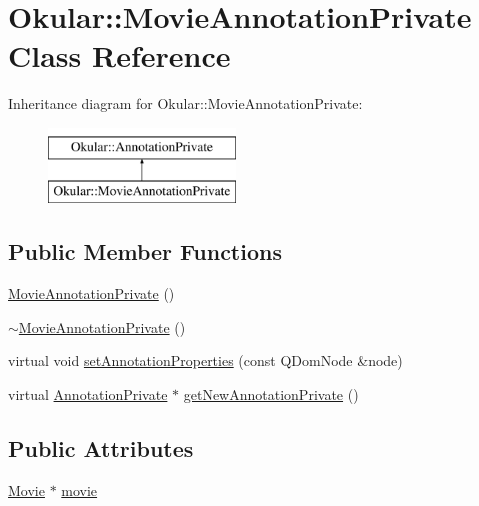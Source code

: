 \hypertarget{classOkular_1_1MovieAnnotationPrivate}{\section{Okular\+:\+:Movie\+Annotation\+Private Class Reference}
\label{classOkular_1_1MovieAnnotationPrivate}
}
Inheritance diagram for Okular\+:\+:Movie\+Annotation\+Private\+:\begin{figure}[H]
\begin{center}
\leavevmode
\includegraphics[height=2.000000cm]{classOkular_1_1MovieAnnotationPrivate}
\end{center}
\end{figure}
\subsection*{Public Member Functions}
\begin{DoxyCompactItemize}
\item 
\hyperlink{classOkular_1_1MovieAnnotationPrivate_ac38968faac343d6e0e3cc54916b3ce3d}{Movie\+Annotation\+Private} ()
\item 
\hyperlink{classOkular_1_1MovieAnnotationPrivate_a75df257ea01681afc93333612029275c}{$\sim$\+Movie\+Annotation\+Private} ()
\item 
virtual void \hyperlink{classOkular_1_1MovieAnnotationPrivate_aa5cb435a725e96aa3feef2049eb6ad10}{set\+Annotation\+Properties} (const Q\+Dom\+Node \&node)
\item 
virtual \hyperlink{classOkular_1_1AnnotationPrivate}{Annotation\+Private} $\ast$ \hyperlink{classOkular_1_1MovieAnnotationPrivate_af113129f949b3bc6018b8dbc9343f157}{get\+New\+Annotation\+Private} ()
\end{DoxyCompactItemize}
\subsection*{Public Attributes}
\begin{DoxyCompactItemize}
\item 
\hyperlink{classOkular_1_1Movie}{Movie} $\ast$ \hyperlink{classOkular_1_1MovieAnnotationPrivate_a8c934fce0e6ec6906f203c4b0b3c153d}{movie}
\end{DoxyCompactItemize}


